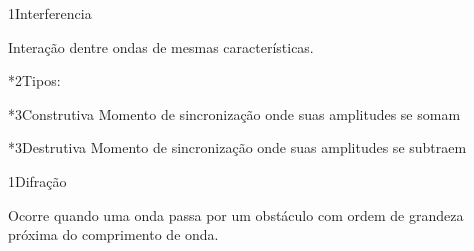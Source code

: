 \begin{sectionBox}1{Interferencia}

    Interação dentre ondas de mesmas características. %


    \begin{sectionBox}*2{Tipos:}
        \begin{multicols}{2}

            \begin{sectionBox}*3{Construtiva}
                Momento de sincronização onde suas amplitudes se somam
            \end{sectionBox}

            \begin{sectionBox}*3{Destrutiva}
                Momento de sincronização onde suas amplitudes se subtraem
            \end{sectionBox}

        \end{multicols}
    \end{sectionBox}

\end{sectionBox}

\begin{sectionBox}1{Difração}

    Ocorre quando uma onda passa por um obstáculo com ordem de grandeza próxima do comprimento de onda.

\end{sectionBox}

